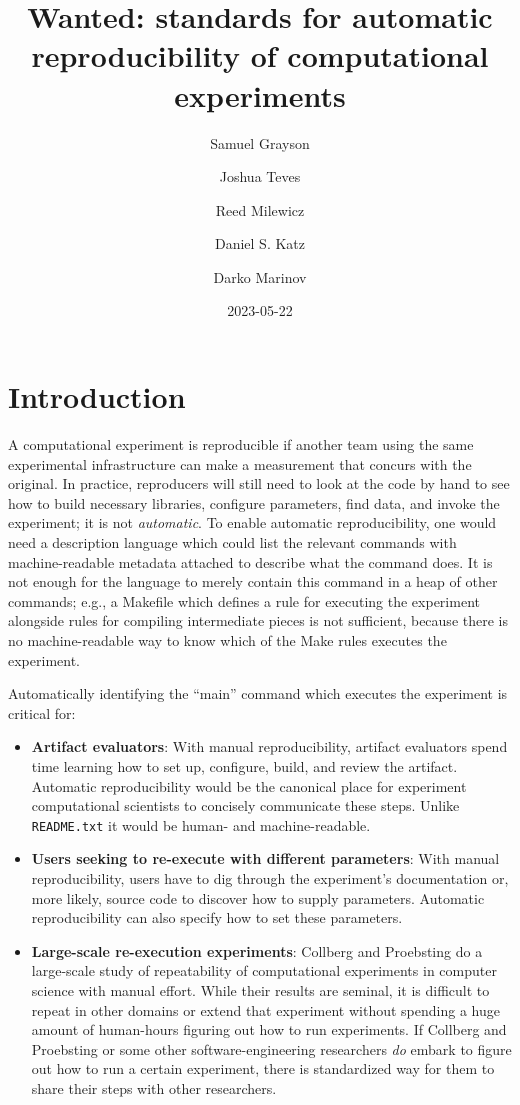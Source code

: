 \documentclass[natbib=false,manuscript,authordraft]{acmart}
\title{Wanted: standards for automatic reproducibility of computational
experiments}
\author{Samuel Grayson}
\affiliation{%
    \institution{University of Illinois Urbana-Champaign}%
    \department{Department of Computer Science}%
    \streetaddress{201 North Goodwin Avenue MC 258}%
    \city{Urbana}%
    \state{IL}%
    \postcode{61801-2302}%
    \country{USA}%
    }
\author{Joshua Teves}
\affiliation{%
    \institution{Sandia National Laboratories}%
    \department{Software Engineering and Research Department}%
    \streetaddress{1515 Eubank Blvd SE1515 Eubank Blvd SE}%
    \city{Albuquerque}%
    \state{NM}%
    \postcode{87123}%
    \country{USA}%
    }
\author{Reed Milewicz}
\affiliation{%
    \institution{Sandia National Laboratories}%
    \department{Software Engineering and Research Department}%
    \streetaddress{1515 Eubank Blvd SE1515 Eubank Blvd SE}%
    \city{Albuquerque}%
    \state{NM}%
    \postcode{87123}%
    \country{USA}%
    }
\author{Daniel S. Katz}
\affiliation{%
    \institution{University of Illinois Urbana-Champaign Department of
Computer Science}%
    \department{Department of Computer Science}\department{National
Center for Supercomputing Applications}\department{Deparment of
Electrical and Computer Engineering}\department{School of Information
Sciences}%
    \streetaddress{201 North Goodwin Avenue MC 258}%
    \city{Urbana}%
    \state{IL}%
    \postcode{61801-2302}%
    \country{USA}%
    }
\author{Darko Marinov}
\affiliation{%
    \institution{University of Illinois Urbana-Champaign}%
    \department{Department of Computer Science}%
    \streetaddress{201 North Goodwin Avenue MC 258}%
    \city{Urbana}%
    \state{IL}%
    \postcode{61801-2302}%
    \country{USA}%
    }
\date{2023-05-22}
\begin{document}
\maketitle

\renewcommand{\shortauthors}{Grayson et al.}


\hypertarget{introduction}{%
\section{Introduction}\label{introduction}}

A computational experiment is reproducible if another team using the
same experimental infrastructure can make a measurement that concurs
with the original. In practice, reproducers will still need to look at
the code by hand to see how to build necessary libraries, configure
parameters, find data, and invoke the experiment; it is not
\emph{automatic}. To enable automatic reproducibility, one would need a
description language which could list the relevant commands with
machine-readable metadata attached to describe what the command does. It
is not enough for the language to merely contain this command in a heap
of other commands; e.g., a Makefile which defines a rule for executing
the experiment alongside rules for compiling intermediate pieces is not
sufficient, because there is no machine-readable way to know which of
the Make rules executes the experiment.

Automatically identifying the ``main'' command which executes the
experiment is critical for:

\begin{itemize}
\item
  \textbf{Artifact evaluators}: With manual reproducibility, artifact
  evaluators spend time learning how to set up, configure, build, and
  review the artifact. Automatic reproducibility would be the canonical
  place for experiment computational scientists to concisely communicate
  these steps. Unlike \texttt{README.txt} it would be human- and
  machine-readable.
\item
  \textbf{Users seeking to re-execute with different parameters}: With
  manual reproducibility, users have to dig through the experiment's
  documentation or, more likely, source code to discover how to supply
  parameters. Automatic reproducibility can also specify how to set
  these parameters.
\item
  \textbf{Large-scale re-execution experiments}: Collberg and Proebsting
  \cite{collberg_repeatability_2016} do a large-scale study of
  repeatability of computational experiments in computer science with
  manual effort. While their results are seminal, it is difficult to
  repeat in other domains or extend that experiment without spending a
  huge amount of human-hours figuring out how to run experiments. If
  Collberg and Proebsting or some other software-engineering researchers
  \emph{do} embark to figure out how to run a certain experiment, there
  is standardized way for them to share their steps with other
  researchers.
\end{itemize}
\end{document}
